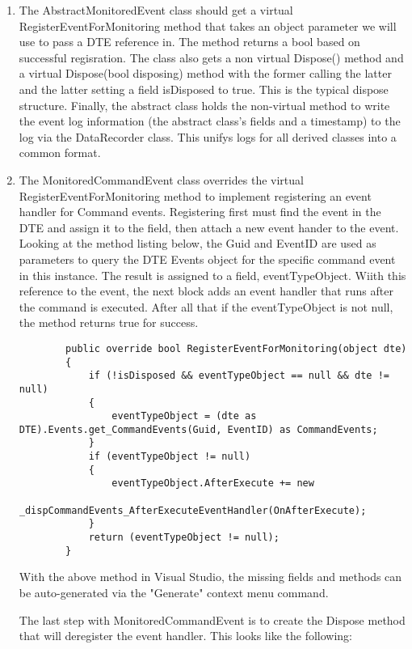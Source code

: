 \begin{enumerate}
\item
The AbstractMonitoredEvent class should get a virtual RegisterEventForMonitoring method that takes an object parameter we will use to pass a DTE reference in.  The method returns a bool based on successful regisration.  The class also gets a non virtual Dispose() method  and a virtual Dispose(bool disposing) method with the former calling the latter and the latter setting a field isDisposed to true. This is the typical dispose structure.  Finally, the abstract class holds the non-virtual method to write the event log information (the abstract class's fields and a timestamp) to the log via the DataRecorder class.  This unifys logs for all derived classes into a common format.

\item
The MonitoredCommandEvent class overrides the virtual RegisterEventForMonitoring method to implement registering an event handler for Command events.  Registering first must find the event in the DTE and assign it to the field, then attach a new event hander to the event.  Looking at the method listing below, the Guid and EventID are used as parameters to query the DTE Events object for the specific command event in this instance.  The result is assigned to a field, eventTypeObject.  Wiith this reference to the event, the next block adds an event handler that runs after the command is executed.  After all that if the eventTypeObject is not null, the method returns true for success.
\begin{lstlisting}
        public override bool RegisterEventForMonitoring(object dte)
        {
            if (!isDisposed && eventTypeObject == null && dte != null)
            {
                eventTypeObject = (dte as DTE).Events.get_CommandEvents(Guid, EventID) as CommandEvents;
            }
            if (eventTypeObject != null)
            {
                eventTypeObject.AfterExecute += new 
			_dispCommandEvents_AfterExecuteEventHandler(OnAfterExecute);
            }
            return (eventTypeObject != null);
        }
\end{lstlisting}

With the above method in Visual Studio, the missing fields and methods can be auto-generated via the "Generate" context menu command.  

The last step with MonitoredCommandEvent is to create the Dispose method that will deregister the event handler. This looks like the following:


\end{enumerate}
